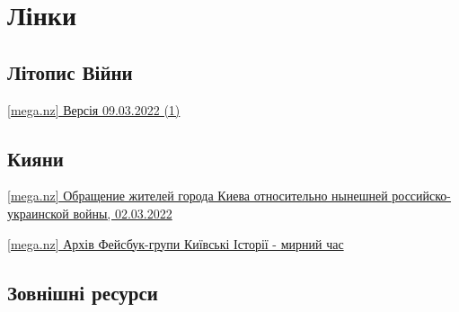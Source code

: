  
 
 
 
 
\section{Лінки}

\subsection{Літопис Війни}

\href{https://mega.nz/file/08E1QARZ#lptMoRBsXDBuR_CLQ98Wr44fUBqcVqFDVfKB6FTzgw0}{%
[mega.nz] Версія 09.03.2022 (1)%
}

\subsection{Кияни}

\href{https://mega.nz/file/pk8QRCiQ#50ewDcF0CdtJ39XEnrc_zodA2fMqq7HGXTA1S7Httuw}{%
[mega.nz] Обращение жителей города Киева относительно нынешней российско-украинской войны, 02.03.2022}

\href{https://mega.nz/file/cltlFCgB#u_J6kOL2TxaLoKgXPKJdYTNpA7-PMcwKicPydJ3P-zk}{%
[mega.nz] Архів Фейсбук-групи Київські Історії - мирний час}

\subsection{Зовнішні ресурси}

